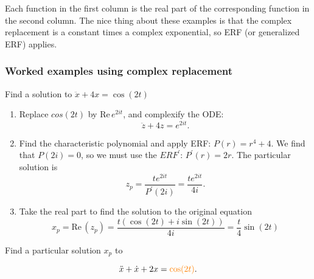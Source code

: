 Each function in the first column is the real part of the corresponding function in the second column. The nice thing about these examples is that the complex replacement is a constant times a complex exponential, so ERF (or generalized ERF) applies.
\clearpage
\subsubsection{Worked examples using complex replacement}

\begin{example}
  Find a solution to $\ddot{x} + 4x = \cos (2t)$
\end{example}
\Solution
\begin{enumerate}
\item Replace $cos (2t)$ by $\mathrm{Re\, }e^{2it}$, and complexify the ODE:
  \begin{equation*}
    \ddot{z} + 4z = e^{2it}. 
  \end{equation*}
\item Find the characteristic polynomial and apply ERF: $P(r) = r^4 +4$.
  We find that $P(2i) = 0$, so we must use the $ERF^{\prime}:\, P^{\prime} (r) = 2r$.
  The particular solution is
  \begin{equation*}
    \displaystyle z_ p
    \displaystyle = \frac{te^{2it}}{P^{\prime} (2i)} = \frac{te^{2it}}{4i}. 
  \end{equation*}
\item Take the real part to find the solution to the original equation
  \begin{equation*}
    \displaystyle x_ p \displaystyle = \mathrm{Re\, } (z_ p)
    \displaystyle = \frac{t\left( \cos (2t) + i \sin (2t)\right)}{4i}
    \displaystyle = \frac{t}{4} \sin (2t)
  \end{equation*}
\end{enumerate}

\begin{example}
  Find a particular solution $x_ p$ to 
\end{example}
\begin{equation*}
  \ddot{x} + \dot{x} + 2x = {\color{orange}{\cos (2t)}} .
\end{equation*}

